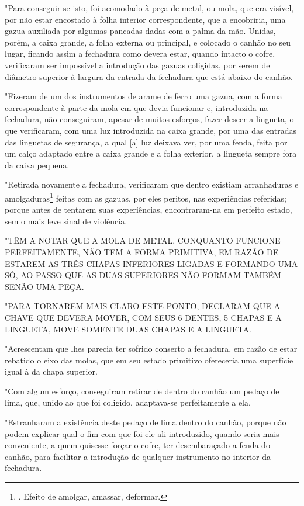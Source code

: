 "Para conseguir-se isto, foi acomodado à peça de metal, ou mola, que era
visível, por não estar encostado à folha interior correspondente, que a
encobriria, uma gazua auxiliada por algumas pancadas dadas com a palma
da mão. Unidas, porém, a caixa grande, a folha externa ou principal, e
colocado o canhão no seu lugar, ficando assim a fechadura como devera
estar, quando intacto o cofre, verificaram ser impossível a introdução
das gazuas coligidas, por serem de diâmetro superior à largura da
entrada da fechadura que está abaixo do canhão.

"Fizeram de um dos instrumentos de arame de ferro uma gazua, com a forma
correspondente à parte da mola em que devia funcionar e, introduzida na
fechadura, não conseguiram, apesar de muitos esforços, fazer descer a
lingueta, o que verificaram, com uma luz introduzida na caixa grande,
por uma das entradas das linguetas de segurança, a qual {[}a{]} luz
deixava ver, por uma fenda, feita por um calço adaptado entre a caixa
grande e a folha exterior, a lingueta sempre fora da caixa pequena.

"Retirada novamente a fechadura, verificaram que dentro existiam
arranhaduras e amolgaduras\footnote{. Efeito de amolgar, amassar,
  deformar.} feitas com as gazuas, por eles peritos, nas experiências
referidas; porque antes de tentarem suas experiências, encontraram-na em
perfeito estado, sem o mais leve sinal de violência.

"TÊM A NOTAR QUE A MOLA DE METAL, CONQUANTO FUNCIONE PERFEITAMENTE, NÃO
TEM A FORMA PRIMITIVA, EM RAZÃO DE ESTAREM AS TRÊS CHAPAS INFERIORES
LIGADAS E FORMANDO UMA SÓ, AO PASSO QUE AS DUAS SUPERIORES NÃO FORMAM
TAMBÉM SENÃO UMA PEÇA.

"PARA TORNAREM MAIS CLARO ESTE PONTO, DECLARAM QUE A CHAVE QUE DEVERA
MOVER, COM SEUS 6 DENTES, 5 CHAPAS E A LINGUETA, MOVE SOMENTE DUAS
CHAPAS E A LINGUETA.

"Acrescentam que lhes parecia ter sofrido conserto a fechadura, em razão
de estar rebatido o eixo das molas, que em seu estado primitivo
ofereceria uma superfície igual à da chapa superior.

"Com algum esforço, conseguiram retirar de dentro do canhão um pedaço de
lima, que, unido ao que foi coligido, adaptava-se perfeitamente a ela.

"Estranharam a existência deste pedaço de lima dentro do canhão, porque
não podem explicar qual o fim com que foi ele ali introduzido, quando
seria mais conveniente, a quem quisesse forçar o cofre, ter
desembaraçado a fenda do canhão, para facilitar a introdução de qualquer
instrumento no interior da fechadura.

